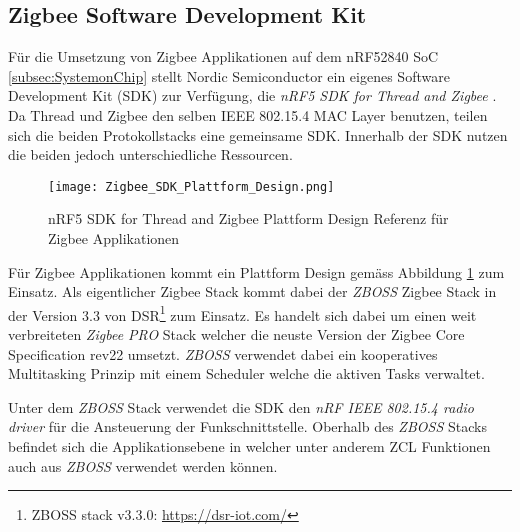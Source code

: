 \subsection{Zigbee Software Development Kit}\label{subsec:ZigbeeSoftwareDevelopmentKit}

Für die Umsetzung von Zigbee Applikationen auf dem nRF52840 SoC \ref{subsec:SystemonChip} stellt Nordic Semiconductor ein eigenes Software Development Kit (SDK) zur Verfügung, die \textit{nRF5 SDK for Thread and Zigbee} \cite{nordic_semi_nrf_sdk_for_thread_and_zigbee_2020}.
Da Thread und Zigbee den selben IEEE 802.15.4 MAC Layer benutzen, teilen sich die beiden Protokollstacks eine gemeinsame SDK.
Innerhalb der SDK nutzen die beiden jedoch unterschiedliche Ressourcen.

\begin{figure}[h]
	\centering
	\texttt{[image: Zigbee\_SDK\_Plattform\_Design.png]}
	\caption{nRF5 SDK for Thread and Zigbee Plattform Design Referenz für Zigbee Applikationen \cite{nordic_semi_nrf_sdk_for_thread_and_zigbee_2020}}
	\label{fig:ZigbeePlattformDesign}
\end{figure}

Für Zigbee Applikationen kommt ein Plattform Design gemäss Abbildung \ref{fig:ZigbeePlattformDesign} zum Einsatz. 
Als eigentlicher Zigbee Stack kommt dabei der \textit{ZBOSS} Zigbee Stack in der Version 3.3 von DSR\footnote{ZBOSS stack v3.3.0: \url{https://dsr-iot.com/}} zum Einsatz.
Es handelt sich dabei um einen weit verbreiteten \textit{Zigbee PRO} Stack welcher die neuste Version der Zigbee Core Specification rev22 umsetzt.
\textit{ZBOSS} verwendet dabei ein kooperatives Multitasking Prinzip mit einem Scheduler welche die aktiven Tasks verwaltet.

Unter dem \textit{ZBOSS} Stack verwendet die SDK den \textit{nRF IEEE 802.15.4 radio driver} für die Ansteuerung der Funkschnittstelle.
Oberhalb des \textit{ZBOSS} Stacks befindet sich die Applikationsebene in welcher unter anderem ZCL Funktionen auch aus \textit{ZBOSS} verwendet werden können.


 

 
